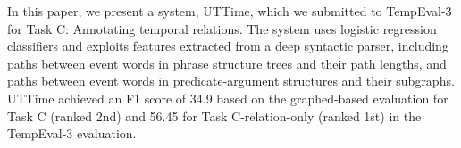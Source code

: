 In this paper, we present a system, UTTime, which we submitted to TempEval-3 for Task C: Annotating temporal relations. The system uses logistic regression
 classifiers and exploits features extracted from a deep syntactic parser,
 including paths between event words in phrase structure trees and their path
 lengths, and paths between event words in predicate-argument structures and
 their subgraphs. UTTime achieved an F1 score of 34.9 based on the graphed-based
 evaluation for Task C (ranked 2nd) and 56.45 for Task C-relation-only (ranked
 1st) in the TempEval-3 evaluation.

